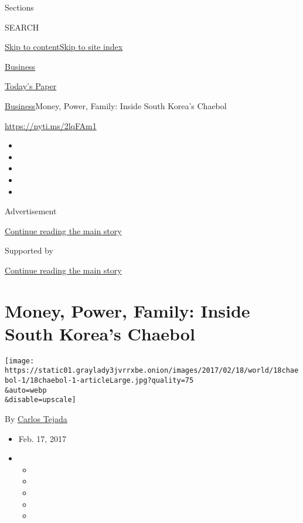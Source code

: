 Sections

SEARCH

\protect\hyperlink{site-content}{Skip to
content}\protect\hyperlink{site-index}{Skip to site index}

\href{https://www.nytimes3xbfgragh.onion/section/business}{Business}

\href{https://myaccount.nytimes3xbfgragh.onion/auth/login?response_type=cookie\&client_id=vi}{}

\href{https://www.nytimes3xbfgragh.onion/section/todayspaper}{Today's
Paper}

\href{/section/business}{Business}\textbar{}Money, Power, Family: Inside
South Korea's Chaebol

\url{https://nyti.ms/2lqFAm1}

\begin{itemize}
\item
\item
\item
\item
\item
\end{itemize}

Advertisement

\protect\hyperlink{after-top}{Continue reading the main story}

Supported by

\protect\hyperlink{after-sponsor}{Continue reading the main story}

\hypertarget{money-power-family-inside-south-koreas-chaebol}{%
\section{Money, Power, Family: Inside South Korea's
Chaebol}\label{money-power-family-inside-south-koreas-chaebol}}

\texttt{[image: https://static01.graylady3jvrrxbe.onion/images/2017/02/18/world/18chaebol-1/18chaebol-1-articleLarge.jpg?quality=75\\\&auto=webp\\\&disable=upscale]}

By \href{https://www.nytimes3xbfgragh.onion/by/carlos-tejada}{Carlos
Tejada}

\begin{itemize}
\item
  Feb. 17, 2017
\item
  \begin{itemize}
  \item
  \item
  \item
  \item
  \item
  \end{itemize}
\end{itemize}

